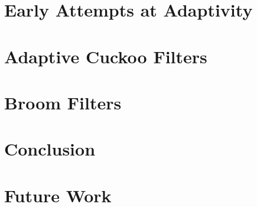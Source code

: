 \documentclass[11pt]{article}
\begin{document}


\section{Early Attempts at Adaptivity}



\section{Adaptive Cuckoo Filters}



\section{Broom Filters}



\section{Conclusion}



\section{Future Work}






\end{document}
